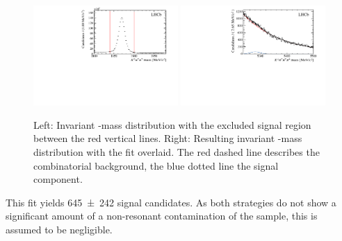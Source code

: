 \begin{figure}[tbp]
    \centering
    \includegraphics[width=0.49\textwidth]{06selection/figs/DmassCut.pdf}
    \includegraphics[width=0.49\textwidth]{06selection/figs/Resulting_Bmass.pdf}
    \caption{Left: Invariant \Dm-mass distribution with the excluded signal region between the red vertical lines.
    Right: Resulting invariant \Bz-mass distribution with the fit overlaid. The red dashed line describes the combinatorial background, the blue dotted line the signal component.}
    \label{fig:nonRes_Try2}
\end{figure}
This fit yields \num{645\pm242} signal candidates.
As both strategies do not show a significant amount of a non-resonant contamination of the sample, this is assumed to be negligible.
